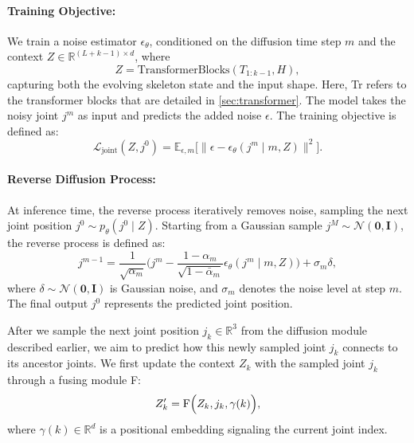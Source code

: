 \paragraph{Training Objective:}
We train a noise estimator \(\epsilon_\theta\), conditioned on the diffusion time step \(m\) and the context \(Z\)$\in\mathbb{R}^{\left(L+k-1\right)\times d}$, where 
\begin{equation}
Z = \text{TransformerBlocks}(T_{1:k-1}, H),
\end{equation}
capturing both the evolving skeleton state and the input shape. Here, Tr refers to the transformer blocks that are detailed in \cref{sec:transformer}. The model takes the noisy joint \(j^m\) as input and predicts the added noise \(\epsilon\). The training objective is defined as:
\begin{equation}
    \mathcal{L}_{\text{joint}}(Z, j^0) = \mathbb{E}_{\epsilon, m} \big[ \| \epsilon - \epsilon_\theta(j^m \mid m, Z) \|^2 \big].
\end{equation}

\paragraph{Reverse Diffusion Process:}
At inference time, the reverse process iteratively removes noise, sampling the next joint position \(j^0 \sim p_\theta(j^0 \mid Z)\). Starting from a Gaussian sample \(j^M \sim \mathcal{N}(\mathbf{0}, \mathbf{I})\), the reverse process is defined as:
\begin{equation}
j^{m-1} = \frac{1}{\sqrt{\alpha_m}} \big(j^m - \frac{1 - \alpha_m}{\sqrt{1 - \bar{\alpha}_m}} \epsilon_\theta(j^m \mid m, Z)\big) + \sigma_m \delta,
\end{equation}
where \(\delta \sim \mathcal{N}(\mathbf{0}, \mathbf{I})\) is Gaussian noise, and \(\sigma_m\) denotes the noise level at step \(m\). The final output \(j^0\) represents the predicted joint position.

 After we sample the next joint position $j_{k} \in \mathbb{R}^3$ from the diffusion module described earlier, we aim to predict how this newly sampled joint $j_{k}$ connects to its ancestor joints. We first update the context $Z_k$ with the sampled joint $j_k$ through a fusing module F:
\begin{equation}
    Z'_{k} = \text{F} \Bigl ( Z_k, j_{k}, \gamma(k) \Bigr ),
\end{equation}
where $\gamma (k)\in \mathbb{R}^d$ is a positional embedding signaling the current joint index.

